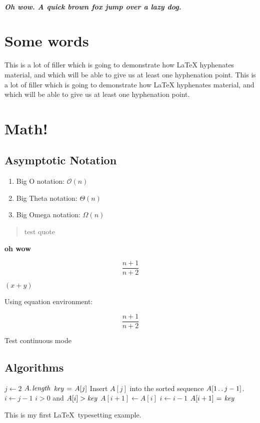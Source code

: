 \documentclass[a4paper]{article}
\begin{document}
\subparagraph{
  Oh wow. A quick brown fox jump over a lazy dog.
}

\section{Some words}

This is a lot of filler which is going to demonstrate how LaTeX hyphenates
material, and which will be able to give us at least one hyphenation point.
This is a lot of filler which is going to demonstrate how LaTeX hyphenates
material, and which will be able to give us at least one hyphenation point.

\section{Math!}

\subsection{Asymptotic Notation}

\begin{enumerate}
  \item Big O notation: $\mathcal{O}(n)$
  \item Big Theta notation: $\Theta(n)$
  \item Big Omega notation: $\Omega(n)$
\end{enumerate}

\begin{quote}
  test quote
\end{quote}

\textbf{oh wow}

\[
  \frac{n + 1}{n + 2}
\]

$\left(x + y\right)$

Using equation environment:

\begin{equation}
  \frac{n + 1}{n + 2}
\end{equation}

Test continuous mode

\subsection{Algorithms}

\begin{codebox}
\li \For $j \gets 2$ \To $\attrib{A}{length}$
\li \Do
$\id{key} \gets A[j]$
\li \Comment Insert $A[j]$ into the sorted sequence
$A[1 \mathinner{\ldotp\ldotp} j-1]$.
\li $i \gets j-1$
\li \While $i > 0$ and $A[i] > \id{key}$
\li \Do
$A[i+1] \gets A[i]$
\li $i \gets i-1$
\End
\li $A[i+1] \gets \id{key}$
\End
\end{codebox}

This is my first \LaTeX\ typesetting example.
\end{document}
